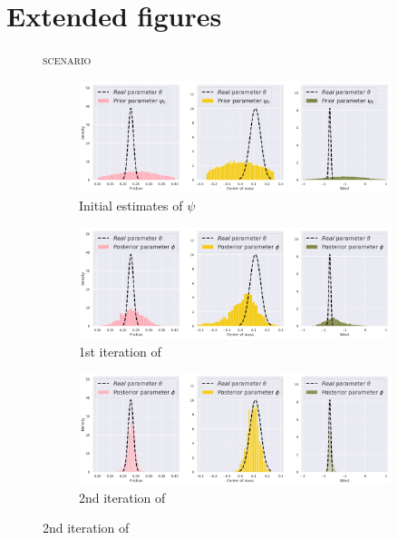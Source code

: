 \chapter{Extended figures}
\label{appendix:a}

\begin{figure}
\centering
    \textsc{\MakeLowercase{\ws{} scenario}}\\
    \medskip
\begin{subfigure}{\linewidth}
  \includegraphics[width=1.0\linewidth]{img/windyslope/latent-representation/latent_encoding_iter0}
  \caption{Initial estimates of $\psi$}
\end{subfigure}
\begin{subfigure}{\linewidth}
  \includegraphics[width=1.0\linewidth]{img/windyslope/latent-representation/latent_encoding_iter1}
  \caption{1st iteration of \dettostoc{}}
\end{subfigure}
\begin{subfigure}{\textwidth}
  \includegraphics[width=1.0\linewidth]{img/windyslope/latent-representation/latent_encoding_iter2}
  \caption{2nd iteration of \dettostoc{}}

\end{subfigure}
\end{figure}

